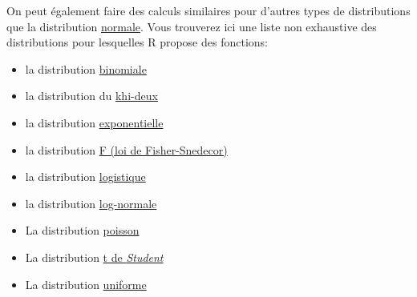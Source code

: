 \documentclass[
]{book}
\providecommand{\tightlist}{%
  \setlength{\itemsep}{0pt}\setlength{\parskip}{0pt}}
\begin{document}
On peut également faire des calculs similaires pour d'autres types de distributions que la distribution \href{https://www.rdocumentation.org/packages/stats/versions/3.6.2/topics/Normal}{normale}. Vous trouverez ici une liste non exhaustive des distributions pour lesquelles R propose des fonctions:

\begin{itemize}
\tightlist
\item
  la distribution \href{https://stat.ethz.ch/R-manual/R-devel/library/stats/html/Binomial.html}{binomiale}
\item
  la distribution du \href{https://www.rdocumentation.org/packages/stats/versions/3.6.2/topics/Chisquare}{khi-deux}
\item
  la distribution \href{https://stat.ethz.ch/R-manual/R-devel/library/stats/html/Exponential.html}{exponentielle}
\item
  la distribution \href{https://stat.ethz.ch/R-manual/R-devel/library/stats/html/Fdist.html}{F (loi de Fisher-Snedecor)}
\item
  la distribution \href{https://www.rdocumentation.org/packages/stats/versions/3.6.2/topics/Logistic}{logistique}
\item
  la distribution \href{https://stat.ethz.ch/R-manual/R-devel/library/stats/html/Lognormal.html}{log-normale}
\item
  La distribution \href{https://stat.ethz.ch/R-manual/R-devel/library/stats/html/Poisson.html}{poisson}
\item
  La distribution \href{https://stat.ethz.ch/R-manual/R-devel/library/stats/html/TDist.html}{t de \emph{Student}}
\item
  La distribution \href{https://www.rdocumentation.org/packages/stats/versions/3.6.2/topics/Uniform}{uniforme}
\end{itemize}

  
\end{document}
